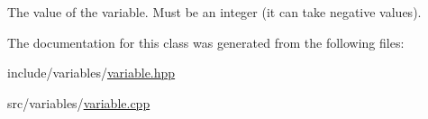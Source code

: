 The value of the variable. Must be an integer (it can take negative values). 



The documentation for this class was generated from the following files\-:\begin{DoxyCompactItemize}
\item 
include/variables/\hyperlink{variable_8hpp}{variable.\-hpp}\item 
src/variables/\hyperlink{variable_8cpp}{variable.\-cpp}\end{DoxyCompactItemize}
